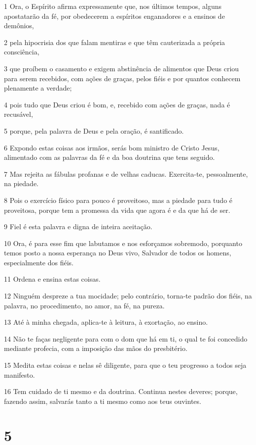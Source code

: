 \par 1 Ora, o Espírito afirma expressamente que, nos últimos tempos, alguns apostatarão da fé, por obedecerem a espíritos enganadores e a ensinos de demônios,
\par 2 pela hipocrisia dos que falam mentiras e que têm cauterizada a própria consciência,
\par 3 que proíbem o casamento e exigem abstinência de alimentos que Deus criou para serem recebidos, com ações de graças, pelos fiéis e por quantos conhecem plenamente a verdade;
\par 4 pois tudo que Deus criou é bom, e, recebido com ações de graças, nada é recusável,
\par 5 porque, pela palavra de Deus e pela oração, é santificado.
\par 6 Expondo estas coisas aos irmãos, serás bom ministro de Cristo Jesus, alimentado com as palavras da fé e da boa doutrina que tens seguido.
\par 7 Mas rejeita as fábulas profanas e de velhas caducas. Exercita-te, pessoalmente, na piedade.
\par 8 Pois o exercício físico para pouco é proveitoso, mas a piedade para tudo é proveitosa, porque tem a promessa da vida que agora é e da que há de ser.
\par 9 Fiel é esta palavra e digna de inteira aceitação.
\par 10 Ora, é para esse fim que labutamos e nos esforçamos sobremodo, porquanto temos posto a nossa esperança no Deus vivo, Salvador de todos os homens, especialmente dos fiéis.
\par 11 Ordena e ensina estas coisas.
\par 12 Ninguém despreze a tua mocidade; pelo contrário, torna-te padrão dos fiéis, na palavra, no procedimento, no amor, na fé, na pureza.
\par 13 Até à minha chegada, aplica-te à leitura, à exortação, ao ensino.
\par 14 Não te faças negligente para com o dom que há em ti, o qual te foi concedido mediante profecia, com a imposição das mãos do presbitério.
\par 15 Medita estas coisas e nelas sê diligente, para que o teu progresso a todos seja manifesto.
\par 16 Tem cuidado de ti mesmo e da doutrina. Continua nestes deveres; porque, fazendo assim, salvarás tanto a ti mesmo como aos teus ouvintes.

\chapter{5}

